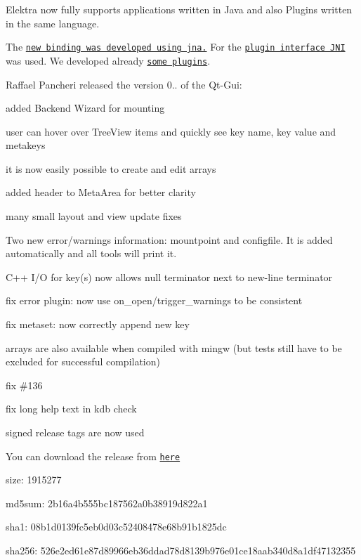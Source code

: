 Elektra now fully supports applications written in Java and also Plugins written in the same language.

The \href{https://github.com/ElektraInitiative/libelektra/tree/master/src/bindings/jna}{\tt new binding was developed using jna.} For the \href{https://github.com/ElektraInitiative/libelektra/tree/master/src/plugins/jni}{\tt plugin interface J\+NI} was used. We developed already \href{https://master.libelektra.org/src/bindings/jna/libelektra4j/src/main/java/org/libelektra/plugin}{\tt some plugins}.

Raffael Pancheri released the version 0.. of the Qt-\/\+Gui\+:


\begin{DoxyItemize}
\item added Backend Wizard for mounting
\item user can hover over Tree\+View items and quickly see key name, key value and metakeys
\item it is now easily possible to create and edit arrays
\item added header to Meta\+Area for better clarity
\item many small layout and view update fixes
\end{DoxyItemize}


\begin{DoxyItemize}
\item Two new error/warnings information\+: mountpoint and configfile. It is added automatically and all tools will print it.
\item C++ I/O for key(s) now allows null terminator next to new-\/line terminator
\item fix error plugin\+: now use {\ttfamily on\+\_\+open}/{\ttfamily trigger\+\_\+warnings} to be consistent
\item fix metaset\+: now correctly append new key
\item arrays are also available when compiled with mingw (but tests still have to be excluded for successful compilation)
\item fix \#136
\item fix long help text in {\ttfamily kdb check}
\item signed release tags are now used
\end{DoxyItemize}

You can download the release from \href{http://www.markus-raab.org/ftp/elektra/releases/elektra-0.8.10.tar.gz}{\tt here}


\begin{DoxyItemize}
\item size\+: 1915277
\item md5sum\+: 2b16a4b555bc187562a0b38919d822a1
\item sha1\+: 08b1d0139fc5eb0d03c52408478e68b91b1825dc
\item sha256\+: 526e2ed61e87d89966eb36ddad78d8139b976e01ce18aab340d8a1df47132355
\end{DoxyItemize}


